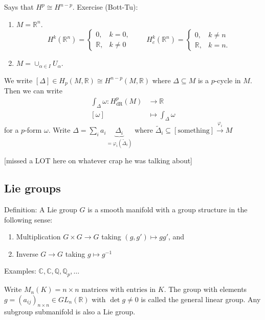 \documentclass[12pt]{article} %
\begin{document}
Says that $H^p \cong H^{n-p}$. Exercise (Bott-Tu):
\begin{enumerate}
\item $M = \mathbb{R}^n$. 
\begin{equation}
	H^k (\mathbb{R}^n) = 
	\begin{cases}
	0, & k = 0, \\
	\mathbb{R}, & k \neq 0
	\end{cases}
	\qquad
	H_c^k (\mathbb{R}^n) = 
	\begin{cases}
	0, & k \neq n \\
	\mathbb{R}, & k = n.
	\end{cases}
\end{equation}

\item $M = \cup_{\alpha \in I} U_\alpha$. 
\end{enumerate}

We write $[\Delta] \in H_p (M, \mathbb{R}) \cong H^{n-p}(M, \mathbb{R})$ where $\Delta \subseteq M$ is a $p$-cycle in $M$. Then we can write 
\begin{align}
\int_\Delta \omega : H_\text{dR}^p(M) &\rightarrow \mathbb{R} \\
[\omega] &\mapsto \int_\Delta \omega
\end{align}
for a $p$-form $\omega$. Write $\Delta = \sum_i a_i \underbrace{\Delta_i}_{=\varphi_i(\tilde{\Delta}_i)}$ where $\tilde{\Delta}_i \subseteq [\text{something}] \overset{\varphi_i}{\longrightarrow} M$

[missed a LOT here on whatever crap he was talking about]


\subsection{Lie groups}

Definition: A Lie group $G$ is a smooth manifold with a group structure in the following sense:
\begin{enumerate}
\item Multiplication $G \times G \rightarrow G$ taking $(g, g') \mapsto gg'$, and
\item Inverse $G \rightarrow G$ taking $g \mapsto g^{-1}$
\end{enumerate}
Examples: $\mathbb{C}, \mathbb{C}, \mathbb{Q}, \mathbb{Q}_p, \dots$

Write $M_n(K) = \text{$n \times n$ matrices with entries in $K$}$. The group with elements $g = (a_{ij})_{n \times n} \in GL_n(\mathbb{R})$ with $\det g \neq 0$ is called the general linear group. Any subgroup submanifold is also a Lie group. 
\end{document}
